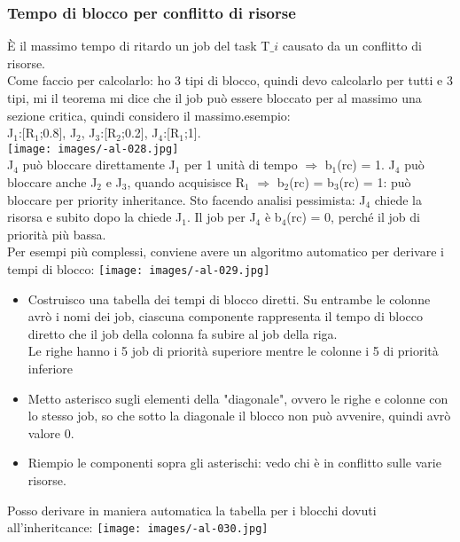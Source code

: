 \documentclass{article}
\begin{document}
\subsubsection{Tempo di blocco per conflitto di risorse}
È il massimo tempo di ritardo un job del task T$\_{i}$ causato da un conflitto di risorse.\\ Come faccio per calcolarlo: ho 3 tipi di blocco, quindi devo calcolarlo per tutti e 3  tipi, mi il teorema mi dice che il job può essere bloccato per al massimo una sezione critica, quindi considero il massimo.esempio:\\ J$_{1}$:[R$_{1}$;0.8], J$_{2}$, J$_{3}$:[R$_{2}$;0.2], J$_{4}$:[R$_{1}$;1].\\ 
\texttt{[image: images/-al-028.jpg]}\\
J$_{4}$ può bloccare direttamente J$_{1}$ per 1 unità di tempo $\Rightarrow$ b$_{1}$(rc) = 1. J$_{4}$ può bloccare anche J$_{2}$ e J$_{3}$, quando acquisisce R$_{1}$ $\Rightarrow$ b$_{2}$(rc) = b$_{3}$(rc) = 1: può bloccare per priority inheritance. Sto facendo analisi pessimista: J$_{4}$ chiede la risorsa e subito dopo la chiede J$_{1}$. Il job per J$_{4}$ è b$_{4}$(rc) = 0, perché il job di priorità più bassa.\\ Per esempi più complessi, conviene avere un algoritmo automatico per derivare i tempi di blocco:
\texttt{[image: images/-al-029.jpg]}
\begin{itemize}
\item Costruisco una tabella dei tempi di blocco diretti. Su entrambe le colonne avrò i nomi dei job, ciascuna componente rappresenta il tempo di blocco diretto che il job della colonna fa subire al job della riga.\\ Le righe hanno i 5 job di priorità superiore mentre le colonne i 5 di priorità inferiore
\item Metto asterisco sugli elementi della "diagonale", ovvero le righe e colonne con lo stesso job, so che sotto la diagonale il blocco non può avvenire, quindi avrò valore 0.
\item Riempio le componenti sopra gli asterischi: vedo chi è in conflitto sulle varie risorse.
\end{itemize}
Posso derivare in maniera automatica la tabella per i blocchi dovuti all'inheritcance: 
\texttt{[image: images/-al-030.jpg]}
\end{document}
